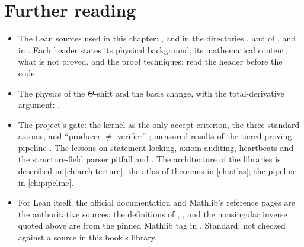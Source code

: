 \section*{Further reading}
\begin{itemize}[leftmargin=*,itemsep=2pt]
\item The Lean sources used in this chapter: ,  and
  in the directories ,  and
  of , and  in
 . Each header
 states its physical background, its mathematical content, what is not proved, and the
 proof techniques; read the header before the code.
\item The physics of the $\Theta$-shift and the basis change, with the total-derivative
 argument: .
\item The project's gate: the kernel as the only accept criterion, the three standard
 axioms, and ``producer $\neq$ verifier'' ;
 measured results of the tiered proving pipeline
 . The lessons on statement locking, axiom
 auditing, heartbeats and the structure-field parser pitfall
  and . The
 architecture of the libraries is described in \cref{ch:architecture}; the atlas of
 theorems in \cref{ch:atlas}; the pipeline in \cref{ch:pipeline}.
\item For Lean itself, the official documentation and Mathlib's reference pages are the
 authoritative sources; the definitions of , ,
  and the nonsingular inverse quoted above are from the pinned Mathlib tag
  in . Standard; not checked against a source in this
 book's library.
\end{itemize}
